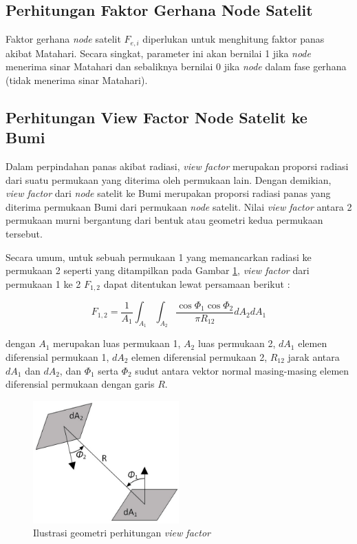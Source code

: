 \subsection{Perhitungan Faktor Gerhana Node Satelit}

Faktor gerhana \textit{node} satelit $F_{e,i}$ diperlukan untuk menghitung faktor panas
akibat Matahari. Secara singkat, parameter ini akan bernilai 1 jika \textit{node}
menerima sinar Matahari dan sebaliknya bernilai 0 jika \textit{node} dalam fase gerhana
(tidak menerima sinar Matahari).

\subsection{Perhitungan View Factor Node Satelit ke Bumi}

Dalam perpindahan panas akibat radiasi, \textit{view factor} merupakan proporsi
radiasi dari suatu permukaan yang diterima oleh permukaan lain. Dengan
demikian, \textit{view factor} dari \textit{node} satelit ke Bumi merupakan
proporsi radiasi panas yang diterima permukaan Bumi dari permukaan
\textit{node} satelit. Nilai \textit{view factor} antara 2 permukaan murni
bergantung dari bentuk atau geometri kedua permukaan tersebut.

Secara umum, untuk sebuah permukaan 1 yang memancarkan radiasi ke permukaan 2 seperti yang
ditampilkan pada Gambar \ref{fig:viewfactor}, \textit{view factor} dari
permukaan 1 ke 2 $F_{1,2}$ dapat ditentukan lewat persamaan berikut
\cite{muneer2020}:

\begin{equation}
\label{eq:viewfactor}
	F_{1,2} = \frac{1}{A_1} \int_{A_1} \int_{A_2} \frac{\cos{\Phi_1} \cos{\Phi_2}}{\pi R_{12}} dA_2 dA_1
\end{equation}

dengan $A_1$ merupakan luas permukaan 1, $A_2$ luas permukaan 2, $dA_1$ elemen
diferensial permukaan 1, $dA_2$ elemen diferensial permukaan 2, $R_{12}$ jarak
antara $dA_1$ dan $dA_2$, dan $\Phi_1$ serta $\Phi_2$ sudut antara vektor
normal masing-masing elemen diferensial permukaan dengan garis $R$.  

\begin{figure}[!ht]
\setlength{}
\begin{center}
\includegraphics[width=0.5\textwidth]{fig/viewfactor.jpg}
	\caption[Ilustrasi geometri perhitungan \textit{view factor}]{Ilustrasi geometri perhitungan \textit{view factor}~\cite{muneer2020}}
\label{fig:viewfactor}
\end{center}
\end{figure}

